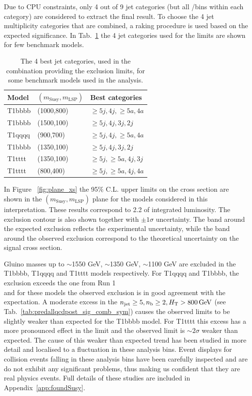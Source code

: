 Due to CPU constraints, only 4 out of 9 jet categories (but all \nb/\scalht bins
within each category) are considered to extract the final result. 
To choose the 4 jet multiplicity categories that are combined, a raking procedure 
is used based on the expected significance. 
In Tab.~\ref{tab:sig-bestCats} the 4 jet categories used for the limits are shown for few benchmark models. 

\begin{table}[h!]
  \caption{
    The 4 best jet categories, used in the combination providing the exclusion limits, 
    for some benchmark models used in the analysis.
  }
  \label{tab:sig-bestCats}
  \centering
  \begin{tabular}{ lll }
    \hline
    \hline
    Model & $(m_{\mathrm{Susy}},m_{\mathrm{LSP}})$ & Best categories \\ 
    \hline
    T1bbbb & (1000,800) & $\geq5j,4j,\geq5a,4a$ \\
    T1bbbb & (1500,100) & $\geq5j,4j,3j,2j$ \\
    T1qqqq & (900,700)  & $\geq5j,4j,\geq5a,4a$ \\
    T1bbbb & (1350,100) & $\geq5j,4j,3j,2j$ \\
    T1tttt & (1350,100) & $\geq5j,\geq5a,4j,3j$ \\
    T1tttt & (800,400) & $\geq5j,\geq5a,4j,4a$ \\
    \hline
    \hline
  \end{tabular}
\end{table}

In Figure ~\ref{fig:plane_xs} the 95\% C.L. upper limits on the cross section are shown 
in the $(m_{\mathrm{Susy}},m_{\mathrm{LSP}})$ plane for the models considered in this interpretation. 
These results correspond to 2.2 \ifb of integrated luminosity. 
The exclusion contour is also shown together with $\pm1\sigma$ uncertainty. 
The band around the expected exclusion reflects the experimental uncertainty, 
while the band around the observed exclusion correspond to the theoretical 
uncertainty on the signal cross section.

Gluino masses up to $\sim$1550 GeV, $\sim$1350 GeV, $\sim$1100 GeV are excluded in the T1bbbb, 
T1qqqq and T1tttt models respectively. 
For T1qqqq and T1bbbb, the exclusion exceeds the one from Run 1 \\
and for these models the observed exclusion is in good agreement with the expectation. 
A moderate excess in the $\njet\geq5, \nb\geq2, \scalht > 800 \, \mathrm{GeV}$ (see Tab.~\ref{tab:predallqcdpost_sig_comb_sym})
causes the observed limits to be slightly weaker than expected for the T1bbbb model. 
For T1tttt this excess has a more pronounced effect in the limit and the observed limit is $\sim 2\sigma$ 
weaker than expected. The cause of this weaker than expected trend has been studied in more detail
and localised to a fluctuation in these analysis bins. Event displays for collision events 
falling in these analysis bins have been carefully inspected and are do not exhibit any 
significant problems, thus making us confident that they are real physics events. Full details
of these studies are included in Appendix~\ref{app:foundSusy}.

